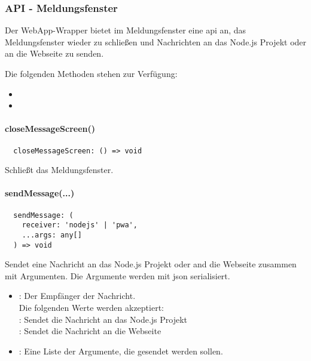 \subsubsection{API - Meldungsfenster}

Der WebApp-Wrapper bietet im Meldungsfenster eine \ac{api} an, das Meldungsfenster wieder zu schließen und Nachrichten an das Node.js Projekt oder an die Webseite zu senden.

Die folgenden Methoden stehen zur Verfügung:

\begin{itemize}
  \setlength\itemsep{-0.8em}
  \item {}
  \item {}
\end{itemize}


\paragraph{closeMessageScreen()}

\begin{verbatim}
  closeMessageScreen: () => void
\end{verbatim}

Schließt das Meldungsfenster.


\paragraph{sendMessage(...)}

\begin{verbatim}
  sendMessage: (
    receiver: 'nodejs' | 'pwa',
    ...args: any[]
  ) => void
\end{verbatim}

Sendet eine Nachricht an das Node.js Projekt oder and die Webseite zusammen mit Argumenten.
Die Argumente werden mit \ac{json} serialisiert.

\begin{itemize}
  \setlength\itemsep{-0.5em}
  \item {}: Der Empfänger der Nachricht.\\
    \hspace*{1em} Die folgenden Werte werden akzeptiert:\\
    \hspace*{1em}: Sendet die Nachricht an das Node.js Projekt\\
    \hspace*{1em}: Sendet die Nachricht an die Webseite
  \item {}: Eine Liste der Argumente, die gesendet werden sollen.
\end{itemize}
